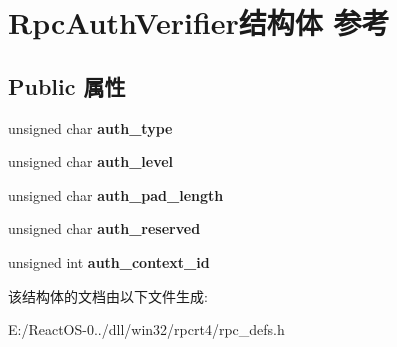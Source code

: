 \hypertarget{struct_rpc_auth_verifier}{}\section{Rpc\+Auth\+Verifier结构体 参考}
\label{struct_rpc_auth_verifier}
\subsection*{Public 属性}
\begin{DoxyCompactItemize}
\item 
\mbox{\label{struct_rpc_auth_verifier_a492cb23bd5a362b1acf7b81f231a1e3f}} 
unsigned char {\bfseries auth\+\_\+type}
\item 
\mbox{\label{struct_rpc_auth_verifier_abfeef36a1f1ef4abf7afa46d10d13544}} 
unsigned char {\bfseries auth\+\_\+level}
\item 
\mbox{\label{struct_rpc_auth_verifier_a910acaeb72c58b4ae0bd8bd8d423fc33}} 
unsigned char {\bfseries auth\+\_\+pad\+\_\+length}
\item 
\mbox{\label{struct_rpc_auth_verifier_aae7ba4e55ae0ca5b58a955bdca074b7d}} 
unsigned char {\bfseries auth\+\_\+reserved}
\item 
\mbox{\label{struct_rpc_auth_verifier_aebbf32d09a09715fde23bd06ed2e0604}} 
unsigned int {\bfseries auth\+\_\+context\+\_\+id}
\end{DoxyCompactItemize}


该结构体的文档由以下文件生成\+:\begin{DoxyCompactItemize}
\item 
E\+:/\+React\+O\+S-\/0../dll/win32/rpcrt4/rpc\+\_\+defs.\+h\end{DoxyCompactItemize}
